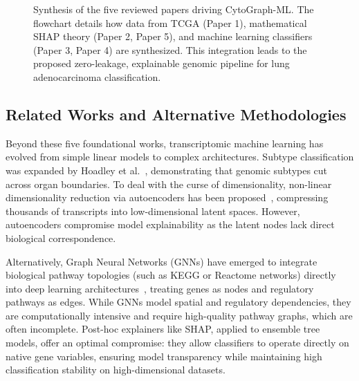 \documentclass[journal,10pt]{IEEEtran}
\begin{document}
\begin{figure}[htbp]
\centering
{}
\caption{Synthesis of the five reviewed papers driving CytoGraph-ML. The flowchart details how data from TCGA (Paper 1), mathematical SHAP theory (Paper 2, Paper 5), and machine learning classifiers (Paper 3, Paper 4) are synthesized. This integration leads to the proposed zero-leakage, explainable genomic pipeline for lung adenocarcinoma classification.}
\label{fig:synthesis_flow}
\end{figure}

\subsection{Related Works and Alternative Methodologies}
Beyond these five foundational works, transcriptomic machine learning has evolved from simple linear models to complex architectures. Subtype classification was expanded by Hoadley et al.~\cite{hoadley}, demonstrating that genomic subtypes cut across organ boundaries. To deal with the curse of dimensionality, non-linear dimensionality reduction via autoencoders has been proposed~\cite{way_ae}, compressing thousands of transcripts into low-dimensional latent spaces. However, autoencoders compromise model explainability as the latent nodes lack direct biological correspondence. 

Alternatively, Graph Neural Networks (GNNs) have emerged to integrate biological pathway topologies (such as KEGG or Reactome networks) directly into deep learning architectures~\cite{path_gnn}, treating genes as nodes and regulatory pathways as edges. While GNNs model spatial and regulatory dependencies, they are computationally intensive and require high-quality pathway graphs, which are often incomplete. Post-hoc explainers like SHAP, applied to ensemble tree models, offer an optimal compromise: they allow classifiers to operate directly on native gene variables, ensuring model transparency while maintaining high classification stability on high-dimensional datasets.
\end{document}
